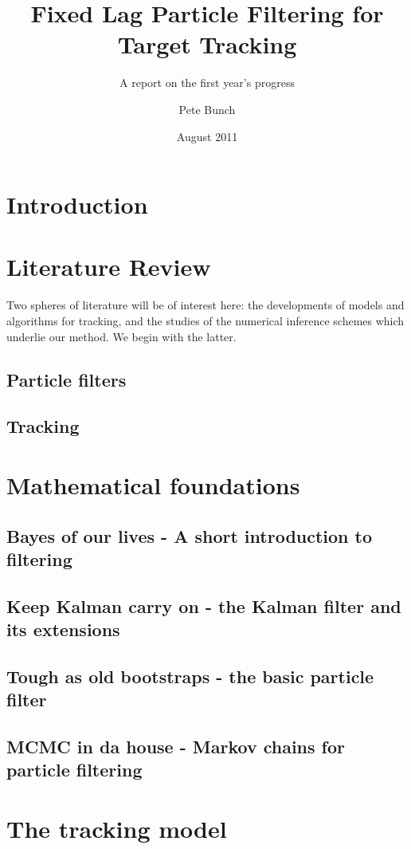 \documentclass{RJWThesis}
\title{Fixed Lag Particle Filtering for Target Tracking}
\subtitle{A report on the first year's progress}
\author{Pete Bunch}
\date{August 2011}
\begin{document}
\maketitle
\tableofcontents


\chapter{Introduction}


\chapter{Literature Review}
Two spheres of literature will be of interest here: the developments of models and algorithms for tracking, and the studies of the numerical inference schemes which underlie our method. We begin with the latter.
\section{Particle filters}

\section{Tracking}


\chapter{Mathematical foundations} \label{chap:basics}
\section{Bayes of our lives - A short introduction to filtering}

\section{Keep Kalman carry on - the Kalman filter and its extensions}

\section{Tough as old bootstraps - the basic particle filter}

\section{MCMC in da house - Markov chains for particle filtering}


\chapter{The tracking model}

\end{document}

